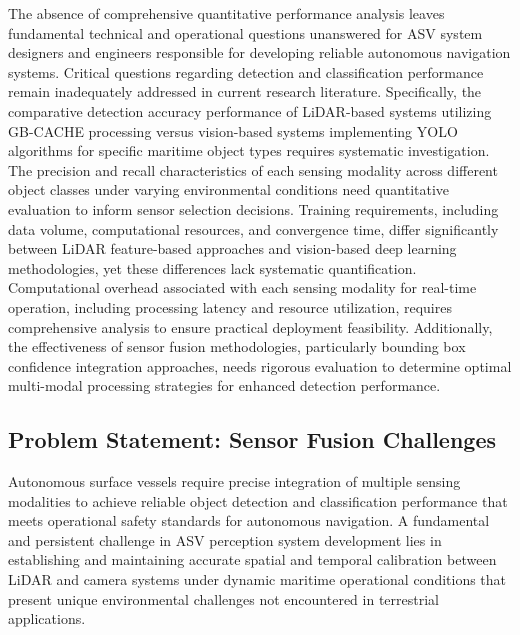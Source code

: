 \documentclass{erauthesis}
\begin{document}
The absence of comprehensive quantitative performance analysis leaves fundamental technical and operational questions unanswered for \ac{ASV} system designers and engineers responsible for developing reliable autonomous navigation systems. Critical questions regarding detection and classification performance remain inadequately addressed in current research literature. Specifically, the comparative detection accuracy performance of \ac{LiDAR}-based systems utilizing \ac{GB-CACHE} processing versus vision-based systems implementing \ac{YOLO} algorithms for specific maritime object types requires systematic investigation. The precision and recall characteristics of each sensing modality across different object classes under varying environmental conditions need quantitative evaluation to inform sensor selection decisions. Training requirements, including data volume, computational resources, and convergence time, differ significantly between \ac{LiDAR} feature-based approaches and vision-based deep learning methodologies, yet these differences lack systematic quantification. Computational overhead associated with each sensing modality for real-time operation, including processing latency and resource utilization, requires comprehensive analysis to ensure practical deployment feasibility. Additionally, the effectiveness of sensor fusion methodologies, particularly bounding box confidence integration approaches, needs rigorous evaluation to determine optimal multi-modal processing strategies for enhanced detection performance.

\subsection{Problem Statement: Sensor Fusion Challenges}

Autonomous surface vessels require precise integration of multiple sensing modalities to achieve reliable object detection and classification performance that meets operational safety standards for autonomous navigation. A fundamental and persistent challenge in \ac{ASV} perception system development lies in establishing and maintaining accurate spatial and temporal calibration between \ac{LiDAR} and camera systems under dynamic maritime operational conditions that present unique environmental challenges not encountered in terrestrial applications.
\end{document}
